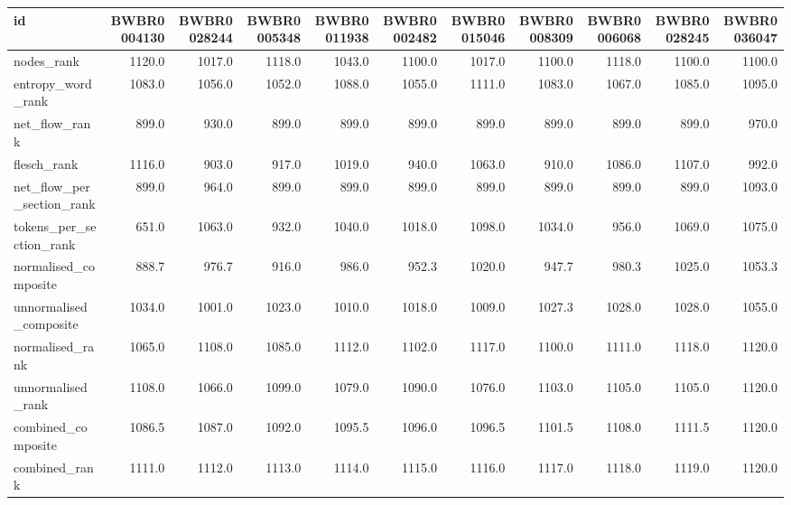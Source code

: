 \begin{tabular}{lrrrrrrrrrr}
\toprule
id & BWBR0004130 & BWBR0028244 & BWBR0005348 & BWBR0011938 & BWBR0002482 & BWBR0015046 & BWBR0008309 & BWBR0006068 & BWBR0028245 & BWBR0036047 \\
\midrule
nodes\_rank & 1120.0 & 1017.0 & 1118.0 & 1043.0 & 1100.0 & 1017.0 & 1100.0 & 1118.0 & 1100.0 & 1100.0 \\
\cline{1-11}
entropy\_word\_rank & 1083.0 & 1056.0 & 1052.0 & 1088.0 & 1055.0 & 1111.0 & 1083.0 & 1067.0 & 1085.0 & 1095.0 \\
\cline{1-11}
net\_flow\_rank & 899.0 & 930.0 & 899.0 & 899.0 & 899.0 & 899.0 & 899.0 & 899.0 & 899.0 & 970.0 \\
\cline{1-11}
flesch\_rank & 1116.0 & 903.0 & 917.0 & 1019.0 & 940.0 & 1063.0 & 910.0 & 1086.0 & 1107.0 & 992.0 \\
\cline{1-11}
net\_flow\_per\_section\_rank & 899.0 & 964.0 & 899.0 & 899.0 & 899.0 & 899.0 & 899.0 & 899.0 & 899.0 & 1093.0 \\
\cline{1-11}
tokens\_per\_section\_rank & 651.0 & 1063.0 & 932.0 & 1040.0 & 1018.0 & 1098.0 & 1034.0 & 956.0 & 1069.0 & 1075.0 \\
\cline{1-11}
normalised\_composite & 888.7 & 976.7 & 916.0 & 986.0 & 952.3 & 1020.0 & 947.7 & 980.3 & 1025.0 & 1053.3 \\
\cline{1-11}
unnormalised\_composite & 1034.0 & 1001.0 & 1023.0 & 1010.0 & 1018.0 & 1009.0 & 1027.3 & 1028.0 & 1028.0 & 1055.0 \\
\cline{1-11}
normalised\_rank & 1065.0 & 1108.0 & 1085.0 & 1112.0 & 1102.0 & 1117.0 & 1100.0 & 1111.0 & 1118.0 & 1120.0 \\
\cline{1-11}
unnormalised\_rank & 1108.0 & 1066.0 & 1099.0 & 1079.0 & 1090.0 & 1076.0 & 1103.0 & 1105.0 & 1105.0 & 1120.0 \\
\cline{1-11}
combined\_composite & 1086.5 & 1087.0 & 1092.0 & 1095.5 & 1096.0 & 1096.5 & 1101.5 & 1108.0 & 1111.5 & 1120.0 \\
\cline{1-11}
combined\_rank & 1111.0 & 1112.0 & 1113.0 & 1114.0 & 1115.0 & 1116.0 & 1117.0 & 1118.0 & 1119.0 & 1120.0 \\
\cline{1-11}
\bottomrule
\end{tabular}
